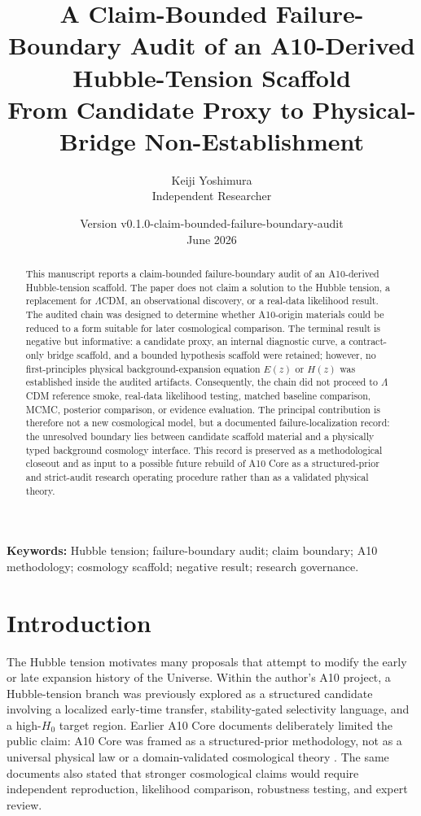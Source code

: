 \documentclass[11pt,a4paper]{article}
\title{A Claim-Bounded Failure-Boundary Audit of an A10-Derived Hubble-Tension Scaffold\\\large From Candidate Proxy to Physical-Bridge Non-Establishment}
\author{Keiji Yoshimura\\ \small Independent Researcher}
\date{Version v0.1.0-claim-bounded-failure-boundary-audit\\June 2026}
\newcommand{\LCDM}{$\Lambda$CDM}
\newcommand{\Ez}{$E(z)$}
\newcommand{\Hz}{$H(z)$}
\begin{document}
\maketitle

\begin{abstract}
This manuscript reports a claim-bounded failure-boundary audit of an A10-derived Hubble-tension scaffold. The paper does not claim a solution to the Hubble tension, a replacement for \LCDM, an observational discovery, or a real-data likelihood result. The audited chain was designed to determine whether A10-origin materials could be reduced to a form suitable for later cosmological comparison. The terminal result is negative but informative: a candidate proxy, an internal diagnostic curve, a contract-only bridge scaffold, and a bounded hypothesis scaffold were retained; however, no first-principles physical background-expansion equation \Ez{} or \Hz{} was established inside the audited artifacts. Consequently, the chain did not proceed to \LCDM{} reference smoke, real-data likelihood testing, matched baseline comparison, MCMC, posterior comparison, or evidence evaluation. The principal contribution is therefore not a new cosmological model, but a documented failure-localization record: the unresolved boundary lies between candidate scaffold material and a physically typed background cosmology interface. This record is preserved as a methodological closeout and as input to a possible future rebuild of A10 Core as a structured-prior and strict-audit research operating procedure rather than as a validated physical theory.
\end{abstract}

\noindent\textbf{Keywords:} Hubble tension; failure-boundary audit; claim boundary; A10 methodology; cosmology scaffold; negative result; research governance.

\section{Introduction}

The Hubble tension motivates many proposals that attempt to modify the early or late expansion history of the Universe. Within the author's A10 project, a Hubble-tension branch was previously explored as a structured candidate involving a localized early-time transfer, stability-gated selectivity language, and a high-$H_0$ target region. Earlier A10 Core documents deliberately limited the public claim: A10 Core was framed as a structured-prior methodology, not as a universal physical law or a domain-validated cosmological theory \cite{YoshimuraA10Core2026}. The same documents also stated that stronger cosmological claims would require independent reproduction, likelihood comparison, robustness testing, and expert review.
\end{document}
